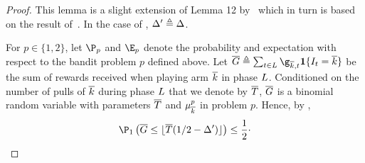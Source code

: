 \begin{proof}
	This lemma is a slight extension of  Lemma 12 
	by~\cite{Auer16AA} %
	which in turn is 
	based on the result of~\cite{Mannor04SC}. In the case of \cite{Auer16AA}, $\Delta' \triangleq \Delta$.
	
	For $p\in\{1,2\}$,
	let $\Pro_{p}$ 	and $\Exp_{p}$ 
	denote the probability and expectation with respect to 
	the  bandit
	problem $p$ defined above. 
	Let $\sumlemma\triangleq\sum_{t\in\earlyPhase} \gainVector_{\refarm,t}\indicator{\pulledArm_t=\refarm}$
		be the sum of rewards received when 
	playing arm $\overline k$ in phase
	$L$. Conditioned on the number of pulls of 
	$\overline k$ during phase $L$ that we denote 
	by  $\overline T$, $\overline G$	
	is a binomial random variable with parameters
	$\overline T$	and $\mu^p_{\overline k}$ in problem $p$.
	Hence, by \cite{Kaas80MM},
	$$
	\Pro_{1}\left(  \sumlemma \leq   \lfloor\pullearlyPhase (1/2-\gap')\rfloor
	\right) \leq \frac12\cdot
	$$
	

\end{proof}
